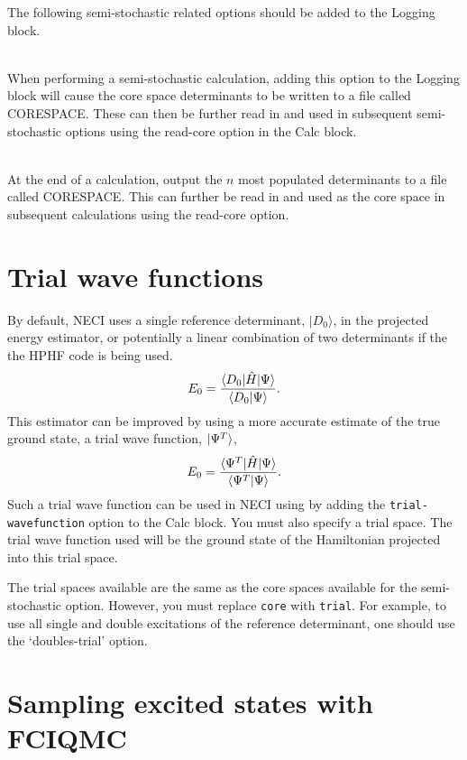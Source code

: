 \documentclass[a4paper,notitlepage]{scrreprt}
\newcommand\codeitem[1]{\needspace{1.5\baselineskip}\item[\textnormal{\ttfamily #1 \nopagebreak}] \hfill \\ \nopagebreak}
\let\code\lstinline
\begin{document}
    The following semi-stochastic related options should be added to the
    Logging block.
    \begin{description}
		\codeitem{write-core}
            When performing a semi-stochastic calculation, adding this option
            to the Logging block will cause the core space determinants to be
            written to a file called CORESPACE. These can then be further read
            in and used in subsequent semi-stochastic options using the
            read-core option in the Calc block.
		\codeitem{write-most-pop-core-end $n$}
            At the end of a calculation, output the $n$ most populated
            determinants to a file called CORESPACE. This can further be read
            in and used as the core space in subsequent calculations using the
            read-core option.
    \end{description}

\section{Trial wave functions}

    By default, NECI uses a single reference determinant, $|D_0\rangle$, in the
    projected energy estimator, or potentially a linear combination of two
    determinants if the the HPHF code is being used.
    \begin{equation}
        E_0 = \frac{\braket{D_0 | \hat{H} | \Psi}}{\braket{D_0 | \Psi}}.
    \end{equation}
    This estimator can be improved by using a more accurate estimate of the
    true ground state, a trial wave function, $\ket{\Psi^T}$,
    \begin{equation}
        E_0 = \frac{\braket{\Psi^T | \hat{H} | \Psi}}{\braket{\Psi^T | \Psi}}.
    \end{equation}
    Such a trial wave function can be used in NECI using by adding the
    \code{trial-wavefunction} option to the Calc block.
    You must also specify a
    trial space. The trial wave function used will be the ground state of the
    Hamiltonian projected into this trial space.

    The trial spaces available are the same as the core spaces available for
    the semi-stochastic option. However, you must replace \code{core} with
    \code{trial}. For
    example, to use all single and double excitations of the reference
    determinant, one should use the `doubles-trial' option.

\section{Sampling excited states with FCIQMC}
\end{document}
